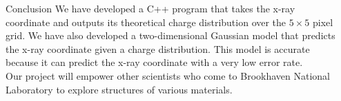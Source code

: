 \documentclass[final]{beamer}
\newlength{\sepwidth}
\newlength{\colwidth}
\newcommand{\separatorcolumn}{\begin{column}{\sepwidth}\end{column}}
\begin{document}
\begin{frame}[t]
\begin{columns}[t]
\begin{column}{\colwidth}
  \begin{block}{Conclusion}
    We have developed a C++ program that takes the x-ray coordinate and outputs its theoretical charge distribution over the $5\times 5$ pixel grid. We have also developed a two-dimensional Gaussian model that predicts the x-ray coordinate given a charge distribution. This model is accurate because it can predict the x-ray coordinate with a very low error rate.\\
    Our project will empower other scientists who come to Brookhaven National Laboratory to explore structures of various materials.
    

  \end{block}


\end{column}

\separatorcolumn
\end{columns}
\end{frame}
\end{document}
